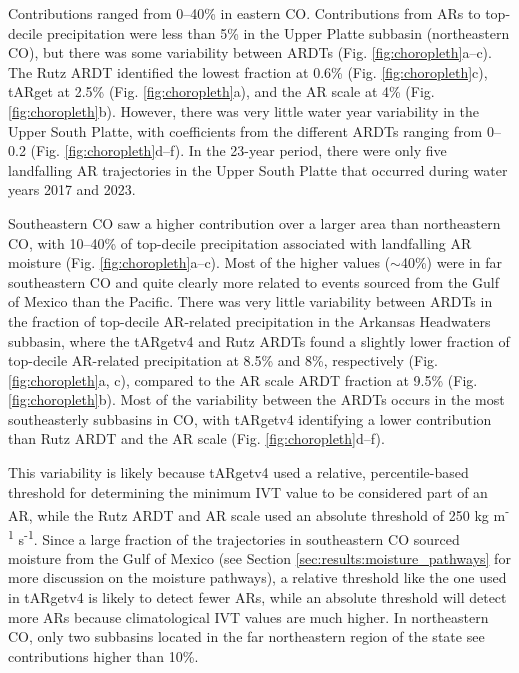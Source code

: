 \documentclass[draft]{agujournal2019}
\begin{document}
Contributions ranged from 0--40\% in eastern CO. Contributions from ARs to top-decile precipitation were less than 5\% in the Upper Platte subbasin (northeastern CO), but there was some variability between ARDTs (Fig. \ref{fig:choropleth}a--c). The Rutz ARDT identified the lowest fraction at 0.6\% (Fig. \ref{fig:choropleth}c), tARget at 2.5\% (Fig. \ref{fig:choropleth}a), and the AR scale at 4\% (Fig. \ref{fig:choropleth}b). However, there was very little water year variability in the Upper South Platte, with coefficients from the different ARDTs ranging from 0--0.2 (Fig. \ref{fig:choropleth}d--f). In the 23-year period, there were only five landfalling AR trajectories in the Upper South Platte that occurred during water years 2017 and 2023. 

Southeastern CO saw a higher contribution over a larger area than northeastern CO, with 10--40\% of top-decile precipitation associated with landfalling AR moisture (Fig. \ref{fig:choropleth}a--c). Most of the higher values ($\sim$40\%) were in far southeastern CO and quite clearly more related to events sourced from the Gulf of Mexico than the Pacific. There was very little variability between ARDTs in the fraction of top-decile AR-related precipitation in the Arkansas Headwaters subbasin, where the tARgetv4 and Rutz ARDTs found a slightly lower fraction of top-decile AR-related precipitation at 8.5\% and 8\%, respectively (Fig. \ref{fig:choropleth}a, c), compared to the AR scale ARDT fraction at 9.5\% (Fig. \ref{fig:choropleth}b). Most of the variability between the ARDTs occurs in the most southeasterly subbasins in CO, with tARgetv4 identifying a lower contribution than Rutz ARDT and the AR scale (Fig. \ref{fig:choropleth}d--f).

This variability is likely because tARgetv4 used a relative, percentile-based threshold for determining the minimum IVT value to be considered part of an AR, while the Rutz ARDT and AR scale used an absolute threshold of 250 kg m\textsuperscript{-1} s\textsuperscript{-1}. Since a large fraction of the trajectories in southeastern CO sourced moisture from the Gulf of Mexico (see Section \ref{sec:results:moisture_pathways} for more discussion on the moisture pathways), a relative threshold like the one used in tARgetv4 is likely to detect fewer ARs, while an absolute threshold will detect more ARs because climatological IVT values are much higher. In northeastern CO, only two subbasins located in the far northeastern region of the state see contributions higher than 10\%. 
\end{document}
